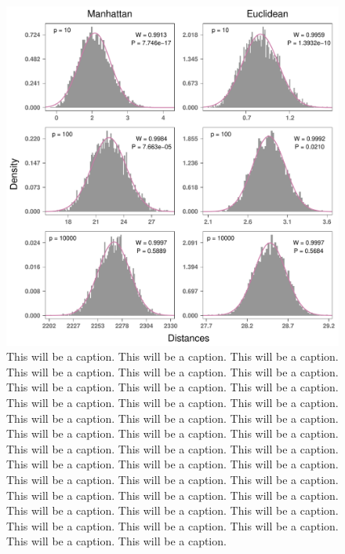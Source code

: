 \documentclass[10pt,letterpaper]{article}\usepackage[]{graphicx}\usepackage[]{color}
\begin{document}
\begin{figure}[H]
	\includegraphics[width=\textwidth]{central_limit_hist_normal_max-min.pdf}
	\caption{This will be a caption. This will be a caption. This will be a caption. This will be a caption. This will be a caption. This will be a caption. This will be a caption. This will be a caption. This will be a caption. This will be a caption. This will be a caption. This will be a caption. This will be a caption. This will be a caption. This will be a caption. This will be a caption. This will be a caption. This will be a caption. This will be a caption. This will be a caption. This will be a caption. This will be a caption. This will be a caption. This will be a caption. This will be a caption. This will be a caption. This will be a caption. This will be a caption. This will be a caption. This will be a caption. This will be a caption. This will be a caption. This will be a caption. This will be a caption. This will be a caption. This will be a caption. This will be a caption. This will be a caption.}
\end{figure}
\end{document}
